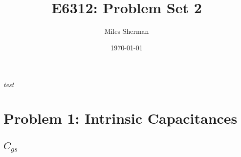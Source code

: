 \documentclass{article}
\begin{document}
\title{E6312: Problem Set 2}
\author{Miles Sherman}
\date{\today}
\maketitle

\textit{test}

\section{Problem 1: Intrinsic Capacitances}
\subsection{$C_{gs}$}

\end{document}
